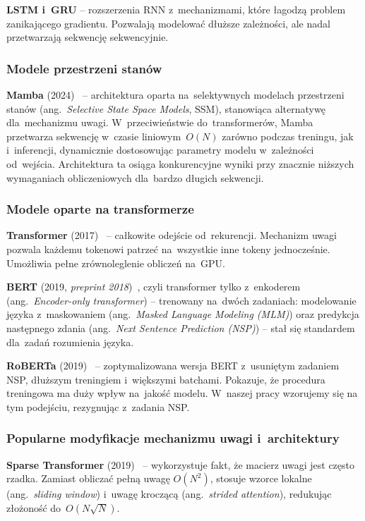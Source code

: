 \documentclass[a4paper,11pt,twoside]{report}
\theoremstyle{definition}
\begin{document}
\textbf{LSTM i~GRU} -- rozszerzenia RNN z~mechanizmami, które łagodzą problem zanikającego gradientu. Pozwalają modelować dłuższe zależności, ale nadal przetwarzają sekwencję sekwencyjnie.

\subsubsection{Modele przestrzeni stanów}

\textbf{Mamba} (2024)~\cite{gu2024mamba} -- architektura oparta na~selektywnych modelach przestrzeni stanów (ang.\ \emph{Selective State Space Models}, SSM), stanowiąca alternatywę dla~mechanizmu uwagi. W~przeciwieństwie do~transformerów, Mamba przetwarza sekwencję w~czasie liniowym~$O(N)$ zarówno podczas treningu, jak i~inferencji, dynamicznie dostosowując parametry modelu w~zależności od~wejścia. Architektura ta osiąga konkurencyjne wyniki przy znacznie niższych wymaganiach obliczeniowych dla~bardzo długich sekwencji.

\subsubsection{Modele oparte na transformerze}

\textbf{Transformer} (2017)~\cite{vaswani2017attention} -- całkowite odejście od~rekurencji. Mechanizm uwagi pozwala każdemu tokenowi patrzeć na~wszystkie inne tokeny jednocześnie. Umożliwia pełne zrównoleglenie obliczeń na~GPU.

\textbf{BERT} (2019, \textit{preprint 2018})~\cite{devlin2019bert}, czyli transformer tylko z~enkoderem (ang.\ \emph{Encoder-only transformer}) -- trenowany na~dwóch zadaniach: modelowanie języka z~maskowaniem (ang.\ \emph{Masked Language Modeling (MLM)}) oraz predykcja następnego zdania (ang.\ \emph{Next Sentence Prediction (NSP)}) -- stał się standardem dla~zadań rozumienia języka.

\textbf{RoBERTa} (2019)~\cite{liu2019roberta} -- zoptymalizowana wersja BERT z~usuniętym zadaniem NSP, dłuższym treningiem i~większymi batchami. Pokazuje, że procedura treningowa ma duży wpływ na~jakość modelu. W~naszej pracy wzorujemy się na tym podejściu, rezygnując z~zadania NSP.

\subsubsection{Popularne modyfikacje mechanizmu uwagi i~architektury}

\textbf{Sparse Transformer} (2019)~\cite{child2019generating} -- wykorzystuje fakt, że macierz uwagi jest często rzadka. Zamiast obliczać pełną uwagę $O(N^2)$, stosuje wzorce lokalne (ang.\ \textit{sliding window}) i~uwagę kroczącą (ang.\ \textit{strided attention}), redukując złożoność do~$O(N \sqrt{N})$.
\end{document}
